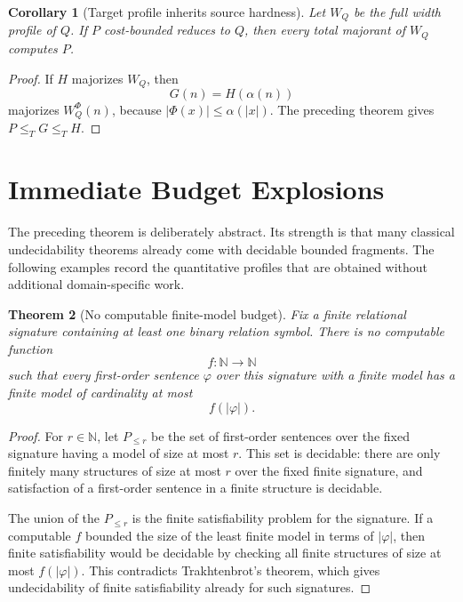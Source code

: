 \documentclass[11pt]{article}
\newtheorem{theorem}{Theorem}[section]
\newtheorem{corollary}[theorem]{Corollary}
\begin{document}
\begin{corollary}[Target profile inherits source hardness]
Let \(W_Q\) be the full width profile of \(Q\). If \(P\) cost-bounded reduces to \(Q\), then every total majorant of \(W_Q\) computes \(P\).
\end{corollary}

\begin{proof}
If \(H\) majorizes \(W_Q\), then
\[
G(n)=H(\alpha(n))
\]
majorizes \(W_Q^\Phi(n)\), because \(|\Phi(x)|\le\alpha(|x|)\). The preceding theorem gives \(P\le_T G\le_T H\).
\end{proof}

\section{Immediate Budget Explosions}

The preceding theorem is deliberately abstract. Its strength is that many classical undecidability theorems already come with decidable bounded fragments. The following examples record the quantitative profiles that are obtained without additional domain-specific work.

\begin{theorem}[No computable finite-model budget]
Fix a finite relational signature containing at least one binary relation symbol. There is no computable function
\[
f:\mathbb N\to\mathbb N
\]
such that every first-order sentence \(\varphi\) over this signature with a finite model has a finite model of cardinality at most
\[
f(|\varphi|).
\]
\end{theorem}

\begin{proof}
For \(r\in\mathbb N\), let \(P_{\leq r}\) be the set of first-order sentences over the fixed signature having a model of size at most \(r\). This set is decidable: there are only finitely many structures of size at most \(r\) over the fixed finite signature, and satisfaction of a first-order sentence in a finite structure is decidable.

The union of the \(P_{\leq r}\) is the finite satisfiability problem for the signature. If a computable \(f\) bounded the size of the least finite model in terms of \(|\varphi|\), then finite satisfiability would be decidable by checking all finite structures of size at most \(f(|\varphi|)\). This contradicts Trakhtenbrot's theorem, which gives undecidability of finite satisfiability already for such signatures.
\end{proof}
\end{document}

